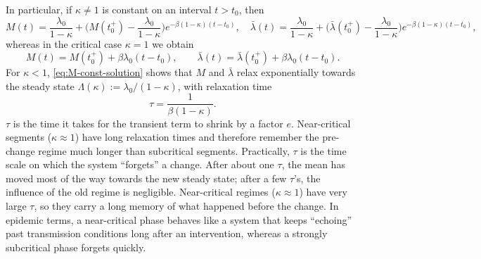 \documentclass{article}
\theoremstyle{plain}
\theoremstyle{definition}
\newcommand{\1}{\mathbf{1}}
\begin{document}
    In particular, if $\kappa\neq 1$ is constant on an interval $t>t_0$, then
    \begin{equation}
    \label{eq:M-const-solution}
    M(t)=\frac{\lambda_0}{1-\kappa}
    +\Big(M(t_0^+)-\frac{\lambda_0}{1-\kappa}\Big)e^{-\beta(1-\kappa)(t-t_0)},\quad
    \bar\lambda(t)=\frac{\lambda_0}{1-\kappa}
    +\Big(\bar\lambda(t_0^+)-\frac{\lambda_0}{1-\kappa}\Big)e^{-\beta(1-\kappa)(t-t_0)},
    \end{equation}
    whereas in the critical case $\kappa=1$ we obtain
    \[
    M(t)=M(t_0^+)+\beta\lambda_0(t-t_0),\qquad
    \bar\lambda(t)=\bar\lambda(t_0^+)+\beta\lambda_0(t-t_0).
    \]
    For $\kappa<1$, \eqref{eq:M-const-solution} shows that $M$ and $\bar\lambda$ relax exponentially towards the steady state $\Lambda(\kappa):=\lambda_0/(1-\kappa)$, with relaxation time
    \[
    \tau=\frac{1}{\beta(1-\kappa)}.
    \]
    $\tau$ is the time it takes for the transient term to shrink by a factor $e$. Near-critical segments ($\kappa\approx 1$) have long relaxation times and therefore remember the pre-change regime much longer than subcritical segments. Practically, \(\tau\) is the time scale on which the system ``forgets'' a change. After about one \(\tau\), the mean has moved most of the way towards the new steady state; after a few \(\tau\)'s, the influence of the old regime is negligible. Near-critical regimes (\(\kappa\approx 1\)) have very large \(\tau\), so they carry a long memory of what happened before the change. In epidemic terms, a near-critical phase behaves like a system that keeps ``echoing'' past transmission conditions long after an intervention, whereas a strongly subcritical phase forgets quickly. 
    
\end{document}
